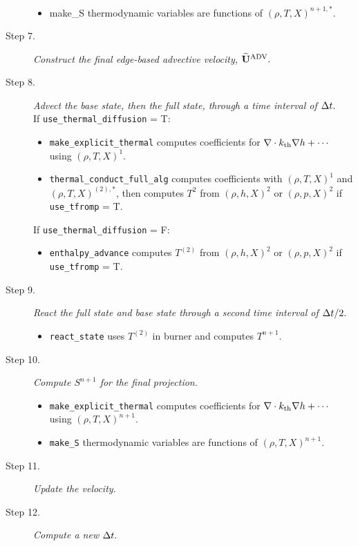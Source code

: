 \begin{description}
\begin{itemize}
\item {make\_S} thermodynamic variables are functions of $(\rho,T,X)^{n+1,*}$.
\end{itemize}
\item[Step 7.] {\em Construct the final edge-based advective velocity, $\widetilde{\mathbf{U}}^{\mathrm{ADV}}.$}
\item[Step 8.] {\em Advect the base state, then the full state, through a time interval 
of $\Delta t.$}\\
If {\tt use\_thermal\_diffusion} = T:
\begin{itemize}
\item {\tt make\_explicit\_thermal} computes coefficients for 
$\nabla\cdot k_{\rm th}\nabla h + \cdots$ using $(\rho,T,X)^1$.
\item {\tt thermal\_conduct\_full\_alg} computes coefficients with $(\rho,T,X)^1$ and
$(\rho,T,X)^{(2),*}$, then computes $T^{2}$ from $(\rho,h,X)^{2}$ or $(\rho,p,X)^{2}$ if 
{\tt use\_tfromp} = T.
\end{itemize}
If {\tt use\_thermal\_diffusion} = F:
\begin{itemize}
\item {\tt enthalpy\_advance} computes $T^{(2)}$ from $(\rho,h,X)^2$ or $(\rho,p,X)^2$
if {\tt use\_tfromp} = T.
\end{itemize}
\item[Step 9.] {\em React the full state and base state through a second time interval 
of $\Delta t/2.$}
\begin{itemize}
\item {\tt react\_state} uses $T^{(2)}$ in burner and computes $T^{n+1}$.
\end{itemize}
\item[Step 10.] {\em Compute $S^{n+1}$ for the final projection.}
\begin{itemize}
\item {\tt make\_explicit\_thermal} computes coefficients for 
$\nabla\cdot k_{\rm th}\nabla h + \cdots$ using $(\rho,T,X)^{n+1}$.
\item {\tt make\_S} thermodynamic variables are functions of $(\rho,T,X)^{n+1}$.
\end{itemize}
\item[Step 11.] {\em Update the velocity.}
\item[Step 12.] {\em Compute a new $\Delta t.$}
\end{description}
